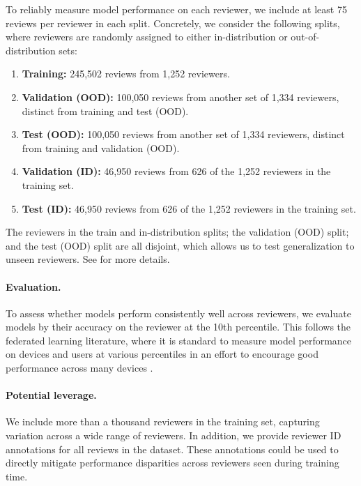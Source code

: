 To reliably measure model performance on each reviewer, we include at least 75 reviews per reviewer in each split.
Concretely, we consider the following splits, where reviewers are randomly assigned to either in-distribution or out-of-distribution sets:
\begin{enumerate}
  \item \textbf{Training:} 245,502 reviews from 1,252 reviewers.
  \item \textbf{Validation (OOD):} 100,050 reviews from another set of 1,334 reviewers, distinct from training and test (OOD).
  \item \textbf{Test (OOD):} 100,050 reviews from another set of 1,334 reviewers, distinct from training and validation (OOD).
  \item \textbf{Validation (ID):} 46,950 reviews from 626 of the 1,252 reviewers in the training set.
  \item \textbf{Test (ID):} 46,950 reviews from 626 of the 1,252 reviewers in the training set.
\end{enumerate}
The reviewers in the train and in-distribution splits; the validation (OOD) split; and the test (OOD) split are all disjoint,
which allows us to test generalization to unseen reviewers.
See  for more details.

\paragraph{Evaluation.}
To assess whether models perform consistently well across reviewers, we evaluate models by their accuracy on the reviewer at the 10th percentile.
This follows the federated learning literature, where it is standard to  measure model performance on devices and users at various percentiles in an effort to encourage good performance across many devices \citep{caldas2018leaf,li2019fair}.

\paragraph{Potential leverage.}
We include more than a thousand reviewers in the training set, capturing variation across a wide range of reviewers.
In addition, we provide reviewer ID annotations for all reviews in the dataset.
These annotations could be used to directly mitigate performance disparities across reviewers seen during training time.

